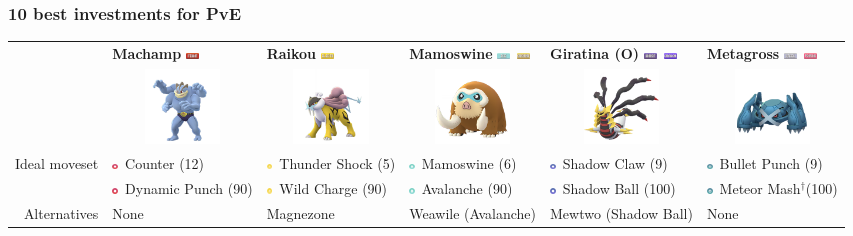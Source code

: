\documentclass[8pt,aspectratio=169,compress]{beamer}
\newcommand{\fightingfull}{\includegraphics[height=0.15cm]{../../images/type/full/Fighting.png}}
\newcommand{\electricfull}{\includegraphics[height=0.15cm]{../../images/type/full/Electric.png}}
\newcommand{\ghostfull}{\includegraphics[height=0.15cm]{../../images/type/full/Ghost.png}}
\newcommand{\dragonfull}{\includegraphics[height=0.15cm]{../../images/type/full/Dragon.png}}
\newcommand{\groundfull}{\includegraphics[height=0.15cm]{../../images/type/full/Ground.png}}
\newcommand{\icefull}{\includegraphics[height=0.15cm]{../../images/type/full/Ice.png}}
\newcommand{\psychicfull}{\includegraphics[height=0.15cm]{../../images/type/full/Psychic.png}}
\newcommand{\steelfull}{\includegraphics[height=0.15cm]{../../images/type/full/Steel.png}}
\newcommand{\fightingsimp}{\includegraphics[height=0.15cm]{../../images/type/simplified/fighting.png}}
\newcommand{\ghostsimp}{\includegraphics[height=0.15cm]{../../images/type/simplified/ghost.png}}
\newcommand{\icesimp}{\includegraphics[height=0.15cm]{../../images/type/simplified/ice.png}}
\newcommand{\electricsimp}{\includegraphics[height=0.15cm]{../../images/type/simplified/electric.png}}
\newcommand{\steelsimp}{\includegraphics[height=0.15cm]{../../images/type/simplified/steel.png}}
\begin{document}
\begin{frame}
\begin{tiny}
\frametitle{10 best investments for PvE}

\begin{block}{}
\begin{center}
\begin{tabular}{rp{2cm}p{2cm}p{2cm}p{2cm}p{2cm}} 
    & \textbf{Machamp} \hfill \fightingfull&  \textbf{Raikou} \hfill \electricfull&  \textbf{Mamoswine} \hfill  \icefull~\groundfull&  \textbf{Giratina (O)} \hfill \ghostfull~\dragonfull & \textbf{Metagross} \hfill \steelfull~\psychicfull  \\ 
    &  \multicolumn{1}{c}{\includegraphics[width=2cm]{../../images/pokemon/Machamp}} &   \multicolumn{1}{c}{\includegraphics[width=2cm]{../../images/pokemon/Raikou} }  &   \multicolumn{1}{c}{\includegraphics[width=2cm]{../../images/pokemon/Mamoswine} }   &   \multicolumn{1}{c}{\includegraphics[width=2cm]{../../images/pokemon/Giratina_o} }   &   \multicolumn{1}{c}{\includegraphics[width=2cm]{../../images/pokemon/Metagross} } \\ \hline
\multirow{2}{*}{Ideal moveset}   & \fightingsimp~Counter (12) & \electricsimp~Thunder Shock (5)  & \icesimp~Mamoswine (6) &\ghostsimp~Shadow Claw (9)&\steelsimp~Bullet Punch (9) \\
    &\fightingsimp~Dynamic Punch (90) &\electricsimp~Wild Charge (90) & \icesimp~Avalanche (90) &\ghostsimp~Shadow Ball (100) & \steelsimp~Meteor Mash$^{\dag}$(100) \\  \hline
Alternatives & None & Magnezone & Weawile (Avalanche) & Mewtwo (Shadow Ball) & None \\
\end{tabular}   


\end{center}
\end{block}
\end{tiny}
\end{frame}
\end{document}
